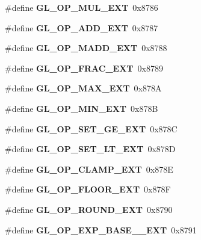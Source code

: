 \begin{DoxyCompactItemize}
\item 
\#define {\bfseries G\+L\+\_\+\+O\+P\+\_\+\+M\+U\+L\+\_\+\+E\+X\+T}~0x8786\label{_s_d_l__opengl_8h_a04b603369054c8349f4644ab7e642e9b}

\item 
\#define {\bfseries G\+L\+\_\+\+O\+P\+\_\+\+A\+D\+D\+\_\+\+E\+X\+T}~0x8787\label{_s_d_l__opengl_8h_a340d7384e252b6a5b22bf56ddee49855}

\item 
\#define {\bfseries G\+L\+\_\+\+O\+P\+\_\+\+M\+A\+D\+D\+\_\+\+E\+X\+T}~0x8788\label{_s_d_l__opengl_8h_a941c222ea42a2b8120d352609b506901}

\item 
\#define {\bfseries G\+L\+\_\+\+O\+P\+\_\+\+F\+R\+A\+C\+\_\+\+E\+X\+T}~0x8789\label{_s_d_l__opengl_8h_acbbf9d859c18093a38931c6d51fc6142}

\item 
\#define {\bfseries G\+L\+\_\+\+O\+P\+\_\+\+M\+A\+X\+\_\+\+E\+X\+T}~0x878\+A\label{_s_d_l__opengl_8h_a89c3062e684f04c8e5799c5654432881}

\item 
\#define {\bfseries G\+L\+\_\+\+O\+P\+\_\+\+M\+I\+N\+\_\+\+E\+X\+T}~0x878\+B\label{_s_d_l__opengl_8h_ae7ee6ae455345576ac1e087352057c34}

\item 
\#define {\bfseries G\+L\+\_\+\+O\+P\+\_\+\+S\+E\+T\+\_\+\+G\+E\+\_\+\+E\+X\+T}~0x878\+C\label{_s_d_l__opengl_8h_a38c73002685e191984d556a63b597425}

\item 
\#define {\bfseries G\+L\+\_\+\+O\+P\+\_\+\+S\+E\+T\+\_\+\+L\+T\+\_\+\+E\+X\+T}~0x878\+D\label{_s_d_l__opengl_8h_a5d4674ce2e6e61d7c6ae1c3cccc6ed0e}

\item 
\#define {\bfseries G\+L\+\_\+\+O\+P\+\_\+\+C\+L\+A\+M\+P\+\_\+\+E\+X\+T}~0x878\+E\label{_s_d_l__opengl_8h_aba09d709f0a7b5f82065ebf77ade1b3e}

\item 
\#define {\bfseries G\+L\+\_\+\+O\+P\+\_\+\+F\+L\+O\+O\+R\+\_\+\+E\+X\+T}~0x878\+F\label{_s_d_l__opengl_8h_ab55d2b3e595e82297991a5d556994ec1}

\item 
\#define {\bfseries G\+L\+\_\+\+O\+P\+\_\+\+R\+O\+U\+N\+D\+\_\+\+E\+X\+T}~0x8790\label{_s_d_l__opengl_8h_a139440e359f8928838f772c00a22874b}

\item 
\#define {\bfseries G\+L\+\_\+\+O\+P\+\_\+\+E\+X\+P\+\_\+\+B\+A\+S\+E\+\_\+\_\+\+E\+X\+T}~0x8791\label{_s_d_l__opengl_8h_a051ab645a105c87ef94733bea72a8719}


\end{DoxyCompactItemize}
